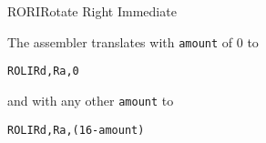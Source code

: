 \begin{instruction}{RORI}{Rotate Right Immediate}
  
\begin{remarks}
The assembler translates \texttt{\mnemonic} with \texttt{amount} of 0 to
\begin{alltt}
  ROLI Rd, Ra, 0
\end{alltt}
and \texttt{\mnemonic} with any other \texttt{amount} to
\begin{alltt}
  ROLI Rd, Ra, (16 - amount)
\end{alltt}
\end{remarks}
\end{instruction}
